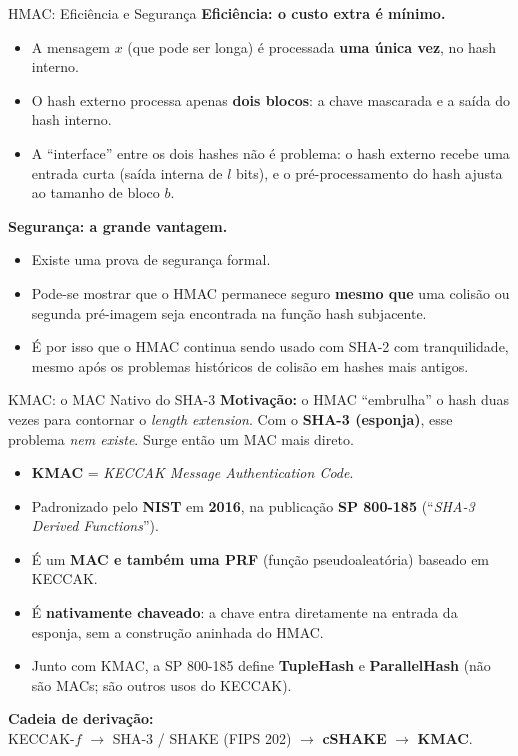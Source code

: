\documentclass{beamer}
\begin{document}
\begin{frame}{HMAC: Eficiência e Segurança}
    \textbf{Eficiência: o custo extra é mínimo.}
    \begin{itemize}
        \footnotesize
        \item A mensagem $x$ (que pode ser longa) é processada \textbf{uma única vez}, no hash interno.
        \item O hash externo processa apenas \textbf{dois blocos}: a chave mascarada e a saída do hash interno.
        \item A ``interface'' entre os dois hashes não é problema: o hash externo recebe uma entrada curta (saída interna de $l$ bits), e o pré-processamento do hash ajusta ao tamanho de bloco $b$.
    \end{itemize}
    \bigskip
    \textbf{Segurança: a grande vantagem.}
    \begin{itemize}
        \footnotesize
        \item Existe uma \alert{prova de segurança} formal.
        \item Pode-se mostrar que o HMAC permanece seguro \textbf{mesmo que} uma colisão ou segunda pré-imagem seja encontrada na função hash subjacente.
        \item É por isso que o HMAC continua sendo usado com SHA-2 com tranquilidade, mesmo após os problemas históricos de colisão em hashes mais antigos.
    \end{itemize}
\end{frame}

\begin{frame}{KMAC: o MAC Nativo do SHA-3}
    \textbf{Motivação:} o HMAC ``embrulha'' o hash duas vezes para contornar o \textit{length extension}. Com o \textbf{SHA-3 (esponja)}, esse problema \emph{nem existe}. Surge então um MAC mais direto.
    \medskip
    \begin{itemize}
        \footnotesize
        \item \textbf{KMAC} = \textit{KECCAK Message Authentication Code}.
        \item Padronizado pelo \textbf{NIST} em \textbf{2016}, na publicação \textbf{SP 800-185} (``\textit{SHA-3 Derived Functions}'').
        \item É um \textbf{MAC e também uma PRF} (função pseudoaleatória) baseado em KECCAK.
        \item É \textbf{nativamente chaveado}: a chave entra diretamente na entrada da esponja, \alert{sem} a construção aninhada do HMAC.
        \item Junto com KMAC, a SP 800-185 define \textbf{TupleHash} e \textbf{ParallelHash} (não são MACs; são outros usos do KECCAK).
    \end{itemize}
    \medskip
    \begin{tcolorbox}[colback=blue!5,colframe=blue!50!black,boxrule=0.5pt]
        \footnotesize
        \textbf{Cadeia de derivação:}\\[4pt]
        KECCAK-$f$ $\rightarrow$ SHA-3 / SHAKE (FIPS 202) $\rightarrow$ \textbf{cSHAKE} $\rightarrow$ \textbf{KMAC}.
    \end{tcolorbox}
\end{frame}
\end{document}
